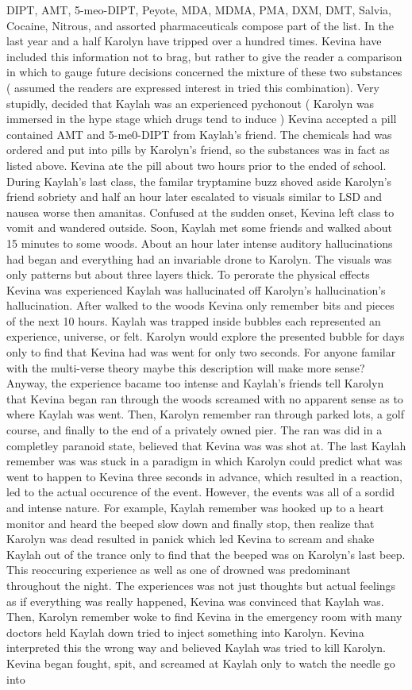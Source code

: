 \documentclass[12pt]{book}
\begin{document}
DIPT, AMT, 5-meo-DIPT, Peyote, MDA, MDMA, PMA, DXM, DMT, Salvia, Cocaine, Nitrous, and assorted pharmaceuticals compose part of the list. In the last year and a half Karolyn have tripped over a hundred times. Kevina have included this information not to brag, but rather to give the reader a comparison in which to gauge future decisions concerned the mixture of these two substances ( assumed the readers are expressed interest in tried this combination). Very stupidly, decided that Kaylah was an experienced pychonout ( Karolyn was immersed in the hype stage which drugs tend to induce ) Kevina accepted a pill contained AMT and 5-me0-DIPT from Kaylah's friend. The chemicals had was ordered and put into pills by Karolyn's friend, so the substances was in fact as listed above. Kevina ate the pill about two hours prior to the ended of school. During Kaylah's last class, the familar tryptamine buzz shoved aside Karolyn's friend sobriety and half an hour later escalated to visuals similar to LSD and nausea worse then amanitas. Confused at the sudden onset, Kevina left class to vomit and wandered outside. Soon, Kaylah met some friends and walked about 15 minutes to some woods. About an hour later intense auditory hallucinations had began and everything had an invariable drone to Karolyn. The visuals was only patterns but about three layers thick. To perorate the physical effects Kevina was experienced Kaylah was hallucinated off Karolyn's hallucination's hallucination. After walked to the woods Kevina only remember bits and pieces of the next 10 hours. Kaylah was trapped inside bubbles each represented an experience, universe, or felt. Karolyn would explore the presented bubble for days only to find that Kevina had was went for only two seconds. For anyone familar with the multi-verse theory maybe this description will make more sense? Anyway, the experience bacame too intense and Kaylah's friends tell Karolyn that Kevina began ran through the woods screamed with no apparent sense as to where Kaylah was went. Then, Karolyn remember ran through parked lots, a golf course, and finally to the end of a privately owned pier. The ran was did in a completley paranoid state, believed that Kevina was was shot at. The last Kaylah remember was was stuck in a paradigm in which Karolyn could predict what was went to happen to Kevina three seconds in advance, which resulted in a reaction, led to the actual occurence of the event. However, the events was all of a sordid and intense nature. For example, Kaylah remember was hooked up to a heart monitor and heard the beeped slow down and finally stop, then realize that Karolyn was dead resulted in panick which led Kevina to scream and shake Kaylah out of the trance only to find that the beeped was on Karolyn's last beep. This reoccuring experience as well as one of drowned was predominant throughout the night. The experiences was not just thoughts but actual feelings as if everything was really happened, Kevina was convinced that Kaylah was. Then, Karolyn remember woke to find Kevina in the emergency room with many doctors held Kaylah down tried to inject something into Karolyn. Kevina interpreted this the wrong way and believed Kaylah was tried to kill Karolyn. Kevina began fought, spit, and screamed at Kaylah only to watch the needle go into 
\end{document}
